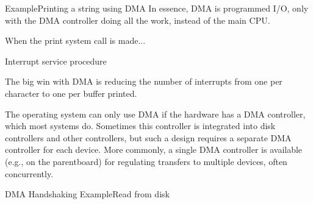 \begin{frame}{Example}{Printing a string using DMA}
  In essence, DMA is programmed I/O, only with the DMA controller doing all the work,
  instead of the main CPU.

  \begin{block}{When the print system call is made...}
    \begin{center}
       
    \end{center}
  \end{block}
  \begin{block}{Interrupt service procedure}
    \begin{center}
       
    \end{center}
  \end{block}
  The big win with DMA is reducing the number of interrupts from one per character to
  one per buffer printed.
\end{frame}

The operating system can only use DMA if the hardware has a DMA controller, which most
systems do. Sometimes this controller is integrated into disk controllers and other
controllers, but such a design requires a separate DMA controller for each device. More
commonly, a single DMA controller is available (e.g., on the parentboard) for regulating
transfers to multiple devices, often concurrently.

\begin{frame}{DMA Handshaking Example}{Read from disk}
  \begin{center}
     
  \end{center}
\end{frame}

